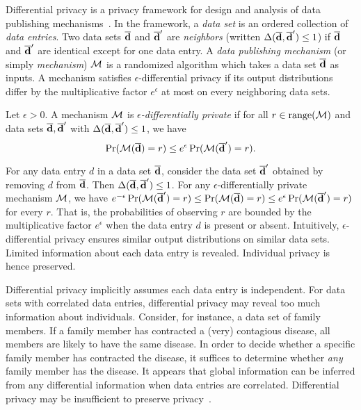 
Differential privacy is a privacy framework for design and analysis of
data publishing mechanisms~\cite{D:06:DP,DR:14:AFDP}. In the
framework, a \emph{data set} is an
ordered collection of \emph{data entries}. Two data sets $\overline{\mathbf{d}}$ and
$\overline{\mathbf{d}}'$ are \emph{neighbors} (written $\Delta (\overline{\mathbf{d}}, \overline{\mathbf{d}}') \leq 1$) if
$\overline{\mathbf{d}}$ and $\overline{\mathbf{d}}'$ are identical except for one data entry. A \emph{data
publishing mechanism} (or simply \emph{mechanism}) $\mathcal{M}$ is a
randomized algorithm which takes a data set $\overline{\mathbf{d}}$ as inputs. A
mechanism satisfies $\epsilon$-differential privacy if its output
distributions differ by the multiplicative factor $e^\epsilon$  at
most on
every neighboring data sets.

\begin{definition}
  Let $\epsilon > 0$. A mechanism $\mathcal{M}$ is
  \emph{$\epsilon$-differentially private} if for all $r \in
  \textmd{range}(\mathcal{M})$ and data sets $\overline{\mathbf{d}}, \overline{\mathbf{d}}'$ with $\Delta (\overline{\mathbf{d}},
  \overline{\mathbf{d}}') \leq 1$, we have
  \[
    \Pr (\mathcal{M} (\overline{\mathbf{d}}) = r) \leq e^{\epsilon} \Pr (\mathcal{M} (\overline{\mathbf{d}}') = r).
  \]
\end{definition}

For any data entry $d$ in a data
set $\overline{\mathbf{d}}$, consider the data set $\overline{\mathbf{d}}'$ obtained by removing $d$ from
$\overline{\mathbf{d}}$. Then $\Delta (\overline{\mathbf{d}}, \overline{\mathbf{d}}') \leq 1$. For any
$\epsilon$-differentially private mechanism $\mathcal{M}$, we have
$e^{-\epsilon} \Pr (\mathcal{M} (\overline{\mathbf{d}}') = r) \leq \Pr (\mathcal{M} (\overline{\mathbf{d}}) = r)
\leq e^{\epsilon} \Pr (\mathcal{M} (\overline{\mathbf{d}}') = r)$ for every $r$. That is, the
probabilities of observing $r$ are bounded by the multiplicative
factor $e^{\epsilon}$ when the data entry $d$ is present or absent.
Intuitively, $\epsilon$-differential privacy ensures similar output
distributions on similar data sets. Limited information about each
data entry is revealed. Individual privacy is hence preserved.

Differential privacy implicitly assumes each data entry is
independent. For data sets with correlated data entries, differential
privacy may reveal too much information about individuals. Consider,
for instance, a data set of family members. If a family member has
contracted a (very) contagious disease, all members are likely to have
the same disease. In order to decide whether a specific family member
has contracted the disease, it suffices to determine whether
\emph{any} family member has the disease. It appears that global
information can be inferred from any differential information
when data entries are correlated. Differential privacy may be
insufficient to preserve privacy~\cite{KM:11:NFLDP}.

